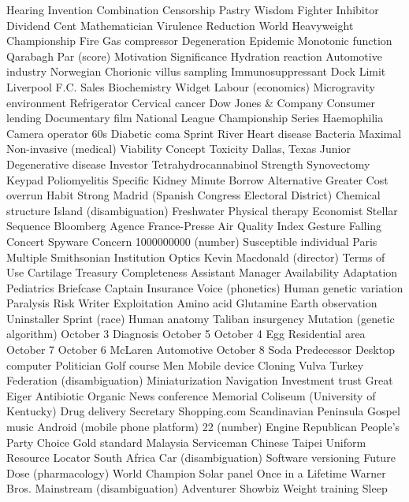 Hearing  Invention  Combination  
Censorship  Pastry  Wisdom  
Fighter  Inhibitor  Dividend  
Cent  Mathematician  Virulence  
Reduction  World Heavyweight Championship  Fire  
Gas compressor  Degeneration  Epidemic  
Monotonic function  Qarabagh  Par (score)  
Motivation  Significance  Hydration reaction  
Automotive industry  Norwegian  Chorionic villus sampling  
Immunosuppressant  Dock  Limit  
Liverpool F.C.  Sales  Biochemistry  
Widget  Labour (economics)  Microgravity environment  
Refrigerator  Cervical cancer  Dow Jones & Company  
Consumer lending  Documentary film  National League Championship Series  
Haemophilia  Camera operator  60s  
Diabetic coma  Sprint  River  
Heart disease  Bacteria  Maximal  
Non-invasive (medical)  Viability  Concept  
Toxicity  Dallas, Texas  Junior  
Degenerative disease  Investor  Tetrahydrocannabinol  
Strength  Synovectomy  Keypad  
Poliomyelitis  Specific  Kidney  
Minute  Borrow  Alternative  
Greater  Cost overrun  Habit  
Strong  Madrid (Spanish Congress Electoral District)  Chemical structure  
Island (disambiguation)  Freshwater  Physical therapy  
Economist  Stellar  Sequence  
Bloomberg  Agence France-Presse  Air Quality Index  
Gesture  Falling  Concert  
Spyware  Concern  1000000000 (number)  
Susceptible individual  Paris  Multiple  
Smithsonian Institution  Optics  Kevin Macdonald (director)  
Terms of Use  Cartilage  Treasury  
Completeness  Assistant Manager  Availability  
Adaptation  Pediatrics  Briefcase  
Captain  Insurance  Voice (phonetics)  
Human genetic variation  Paralysis  Risk  
Writer  Exploitation  Amino acid  
Glutamine  Earth observation  Uninstaller  
Sprint (race)  Human anatomy  Taliban insurgency  
Mutation (genetic algorithm)  October 3  Diagnosis  
October 5  October 4  Egg  
Residential area  October 7  October 6  
McLaren Automotive  October 8  Soda  
Predecessor  Desktop computer  Politician  
Golf course  Men  Mobile device  
Cloning  Vulva  Turkey  
Federation (disambiguation)  Miniaturization  Navigation  
Investment trust  Great  Eiger  
Antibiotic  Organic  News conference  
Memorial Coliseum (University of Kentucky)  Drug delivery  Secretary  
Shopping.com  Scandinavian Peninsula  Gospel music  
Android (mobile phone platform)  22 (number)  Engine  
Republican People's Party  Choice  Gold standard  
Malaysia  Serviceman  Chinese Taipei  
Uniform Resource Locator  South Africa  Car (disambiguation)  
Software versioning  Future  Dose (pharmacology)  
World Champion  Solar panel  Once in a Lifetime  
Warner Bros.  Mainstream (disambiguation)  Adventurer  
Showbiz  Weight training  Sleep  
